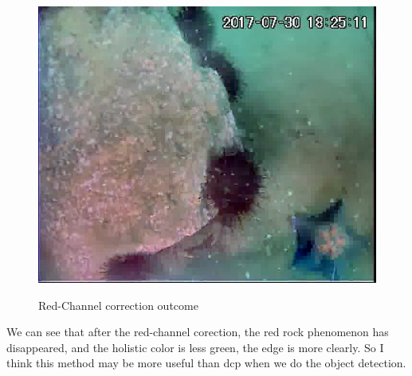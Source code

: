 \documentclass[10pt,twocolumn,letterpaper]{article}
\begin{document}
\begin{figure}
		\centering{}
		\includegraphics[width=0.9\linewidth]{dcp(rc).jpg}\\
		\caption{Red-Channel correction outcome}
		\label{rc} 	
\end{figure}
\par We can see that after the red-channel corection, the red rock phenomenon has disappeared, and the holistic color is less green, the edge is more clearly. So I think this method may be more useful than dcp when we do the object detection.
  
  
\end{document}
